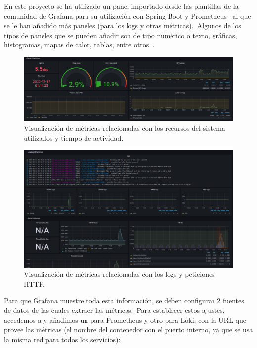 En este proyecto se ha utilizado un panel importado desde las plantillas de la comunidad de Grafana para su utilización
con Spring Boot y Prometheus~\cite{spring-dashboard} al que se le han añadido más paneles (para los logs y otras
métricas).\ Algunos de los tipos de paneles que se pueden añadir son de tipo numérico o texto, gráficas, histogramas,
mapas de calor, tablas, entre otros~\cite{visualizaciones-grafana}.

\begin{figure}[H]
	\centering
	\includegraphics[width=\textwidth]{res/images/GrafanaDashboard_1}
	\caption{Visualización de métricas relacionadas con los recursos del sistema utilizados y tiempo de actividad.}
	\label{fig:grafana-dashboard_1}
\end{figure}

\begin{figure}[H]
	\centering
	\includegraphics[width=\textwidth]{res/images/GrafanaDashboard_2}
	\caption{Visualización de métricas relacionadas con los logs y peticiones HTTP.}
	\label{fig:grafana-dashboard_2}
\end{figure}

Para que Grafana muestre toda esta información, se deben configurar 2 fuentes de datos de las cuales extraer las
métricas.\ Para establecer estos ajustes, accedemos a  y añadimos un
 para Prometheus y otro para Loki, con la URL que provee las métricas (el nombre del contenedor con
el puerto interno, ya que se usa la misma red para todos los servicios):

